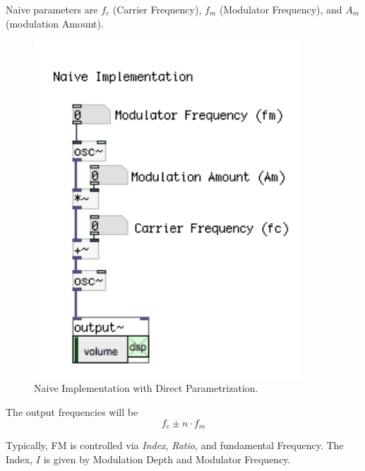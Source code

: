 Naive parameters are ${f_c}$ (Carrier Frequency), ${f_m}$ (Modulator Frequency), and ${A_m}$ (modulation Amount).

\begin{figure}[H]
	\begin{center}
		\includegraphics[width = 10cm]{img/FMnaive.png}
		\caption{Naive Implementation with Direct Parametrization.}
		\label{fig:fmNaive}
	\end{center}
\end{figure}

The output frequencies will be
\begin{equation}
	f_c \pm n \cdot f_m
\end{equation}

Typically, FM is controlled via \textit{Index}, \textit{Ratio}, and fundamental Frequency. The Index, ${I}$ is given by Modulation Depth and Modulator Frequency.

